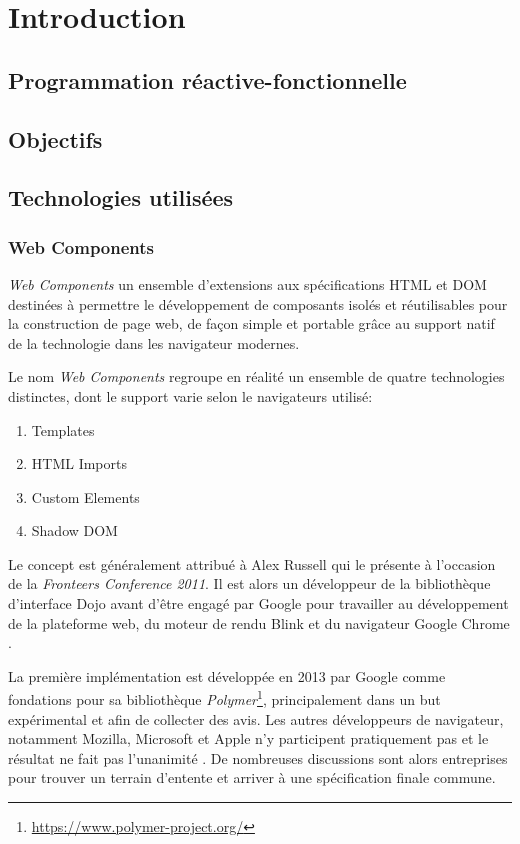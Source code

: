 \chapter{Introduction}

\section{Programmation réactive-fonctionnelle}
\section{Objectifs}



\section{Technologies utilisées}

\subsection{Web Components}

\emph{Web Components} un ensemble d'extensions aux spécifications HTML et DOM destinées à permettre le développement de composants isolés et réutilisables pour la construction de page web, de façon simple et portable grâce au support natif de la technologie dans les navigateur modernes.

Le nom \emph{Web Components} regroupe en réalité un ensemble de quatre technologies distinctes, dont le support varie selon le navigateurs utilisé:
\begin{enumerate}
	\item Templates
	\item HTML Imports
	\item Custom Elements
	\item Shadow DOM
\end{enumerate}

Le concept est généralement attribué à Alex Russell \cite{russell2011} qui le présente à l'occasion de la \emph{Fronteers Conference 2011}. Il est alors un développeur de la bibliothèque d'interface Dojo avant d'être engagé par Google pour travailler au développement de la plateforme web, du moteur de rendu Blink et du navigateur Google Chrome \cite{russellIN}.

La première implémentation est développée en 2013 par Google comme fondations pour sa bibliothèque \emph{Polymer}\footnote{\url{https://www.polymer-project.org/}}, principalement dans un but expérimental et afin de collecter des avis. Les autres développeurs de navigateur, notamment Mozilla, Microsoft et Apple n'y participent pratiquement pas et le résultat ne fait pas l'unanimité \cite{stateOfWebComp}. De nombreuses discussions sont alors entreprises pour trouver un terrain d'entente et arriver à une spécification finale commune.

